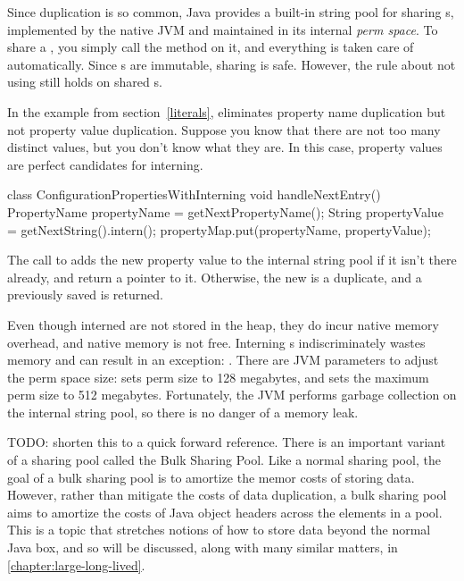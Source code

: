  Since  duplication is so common, Java provides a built-in string
 pool for sharing s, implemented by the native JVM and maintained in
 its internal \emph{perm space}. To share a , you simply call the
 method  on it, and everything is taken care of automatically.
Since s are immutable, sharing is safe. However, the rule about
not using \code{==} still holds on shared s.
  
In the example from section~\ref{literals},
 eliminates property
name duplication but not
property value duplication. Suppose you know that there are
not too many distinct values, but you don't know what they are. In this case,
property values are perfect candidates for interning.
\begin{shortlisting}
 
 class ConfigurationPropertiesWithInterning {
    void handleNextEntry() {
       PropertyName propertyName = getNextPropertyName(); 
       String propertyValue = getNextString().intern();
       propertyMap.put(propertyName, propertyValue);
    }
}
\end{shortlisting}

The call to  adds the new property value 
 to the internal string
pool if it isn't there already, and return a pointer to it. Otherwise, the
new  is a duplicate, and a previously saved  is
returned.

Even though interned  are not stored in the heap, they do incur
native memory overhead, and native memory is not free.
 Interning s indiscriminately wastes memory and can result in an
 exception: . 
There are JVM parameters to adjust the perm space size:
 sets perm size to 128 megabytes, and
 sets the maximum perm size to 512 megabytes.
Fortunately, the JVM performs garbage collection on the internal string pool, so there is no danger of a memory leak.

TODO: shorten this to a quick forward reference. There is an
important variant of a sharing pool called the Bulk Sharing Pool. Like a normal sharing pool, the goal of a bulk sharing pool is to amortize the
memor costs of storing data. However, rather than mitigate the costs of data
duplication, a bulk sharing pool aims to amortize the costs of Java object
headers across the elements in a pool. This is a topic that stretches notions of
how to store data beyond the normal Java box, and so will be discussed, along
with many similar matters, in \autoref{chapter:large-long-lived}.

